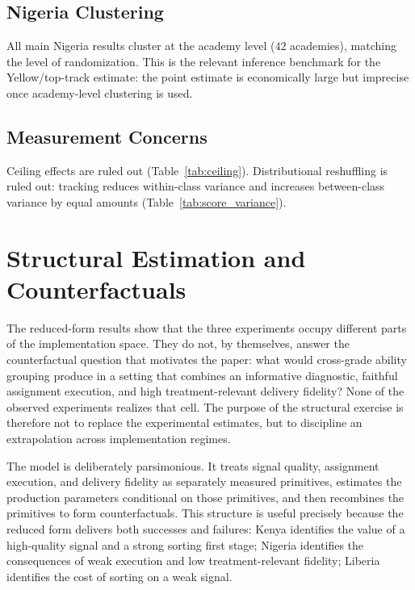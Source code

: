 \documentclass[11pt]{article}
\begin{document}
\subsection{Nigeria Clustering}

All main Nigeria results cluster at the academy level ($42$ academies), matching the level of randomization. This is the relevant inference benchmark for the Yellow/top-track estimate: the point estimate is economically large but imprecise once academy-level clustering is used.

\subsection{Measurement Concerns}

Ceiling effects are ruled out (Table~\ref{tab:ceiling}). Distributional reshuffling is ruled out: tracking reduces within-class variance and increases between-class variance by equal amounts (Table~\ref{tab:score_variance}).



\section{Structural Estimation and Counterfactuals}
\label{sec:structural}

The reduced-form results show that the three experiments occupy different parts of the implementation space. They do not, by themselves, answer the counterfactual question that motivates the paper: what would cross-grade ability grouping produce in a setting that combines an informative diagnostic, faithful assignment execution, and high treatment-relevant delivery fidelity? None of the observed experiments realizes that cell. The purpose of the structural exercise is therefore not to replace the experimental estimates, but to discipline an extrapolation across implementation regimes.

The model is deliberately parsimonious. It treats signal quality, assignment execution, and delivery fidelity as separately measured primitives, estimates the production parameters conditional on those primitives, and then recombines the primitives to form counterfactuals. This structure is useful precisely because the reduced form delivers both successes and failures: Kenya identifies the value of a high-quality signal and a strong sorting first stage; Nigeria identifies the consequences of weak execution and low treatment-relevant fidelity; Liberia identifies the cost of sorting on a weak signal.
\end{document}
